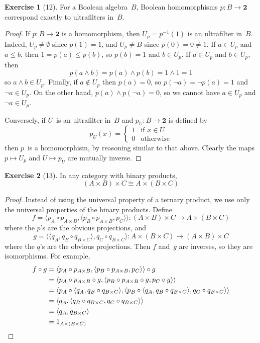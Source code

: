 \documentclass[letterpaper,12pt]{article}
\newcommand{\iso}{\cong}
\newcommand{\meet}{\wedge}
\newcommand{\compl}{\lnot}
\newcommand{\after}{\circ}
\newcommand{\pair}[2]{\langle{#1},{#2}\rangle}
\newcommand{\inv}[1]{#1^{-1}}
\newcommand{\cat}[1]{\mathbf{#1}}
\theoremstyle{definition}
\newtheorem*{exer}{Exercise}
\theoremstyle{remark}
\theoremstyle{direction}
\begin{document}
\begin{exer}[12]
For a Boolean algebra~\(B\), Boolean homomorphisms \(p:B\to\cat{2}\) correspond exactly to ultrafilters in~\(B\).
\end{exer}
\begin{proof}
If \(p:B\to\cat{2}\) is a homomorphism, then \(U_p=\inv{p}(1)\) is an ultrafilter in~\(B\). Indeed, \(U_p\ne\emptyset\) since \(p(1)=1\), and \(U_p\ne B\) since \(p(0)=0\ne 1\). If \(a\in U_p\) and \(a\le b\), then \(1=p(a)\le p(b)\), so \(p(b)=1\) and \(b\in U_p\). If \(a\in U_p\) and \(b\in U_p\), then
\[p(a\meet b)=p(a)\meet p(b)=1\meet 1=1\]
so \(a\meet b\in U_p\). Finally, if \(a\not\in U_p\) then \(p(a)=0\), so \(p(\compl a)=\compl p(a)=1\) and \(\compl a\in U_p\). On the other hand, \(p(a)\meet p(\compl a)=0\), so we cannot have \(a\in U_p\) and \(\compl a\in U_p\).

Conversely, if \(U\)~is an ultrafilter in~\(B\) and \(p_U:B\to\cat{2}\) is defined by
\[
p_U(x)=\begin{cases}
1&\text{if }x\in U\\
0&\text{otherwise}
\end{cases}
\]
then \(p\)~is a homomorphism, by reasoning similar to that above. Clearly the maps \(p\mapsto U_p\) and \(U\mapsto p_U\) are mutually inverse.
\end{proof}

\begin{exer}[13]
In any category with binary products,
\[(A\times B)\times C\iso A\times (B\times C)\]
\end{exer}
\begin{proof}
Instead of using the universal property of a ternary product, we use only the universal properties of the binary products. Define
\[f=\pair{p_A\after p_{A\times B}}{\pair{p_B\after p_{A\times B}}{p_C}}:(A\times B)\times C\to A\times(B\times C)\]
where the \(p\)'s are the obvious projections, and
\[g=\pair{\pair{q_A}{q_B\after q_{B\times C}}}{q_C\after q_{B\times C}}:A\times(B\times C)\to(A\times B)\times C\]
where the \(q\)'s are the obvious projections. Then \(f\) and~\(g\) are inverses, so they are isomorphisms. For example,
\begin{align*}
f\after g&=\pair{p_A\after p_{A\times B}}{\pair{p_B\after p_{A\times B}}{p_C}}\after g\\
	&=\pair{p_A\after p_{A\times B}\after g}{\pair{p_B\after p_{A\times B}\after g}{p_C\after g}}\\
	&=\pair{p_A\after \pair{q_A}{q_B\after q_{B\times C}}}{\pair{p_B\after \pair{q_A}{q_B\after q_{B\times C}}}{q_C\after q_{B\times C}}}\\
	&=\pair{q_A}{\pair{q_B\after q_{B\times C}}{q_C\after q_{B\times C}}}\\
	&=\pair{q_A}{q_{B\times C}}\\
	&=1_{A\times(B\times C)}\qedhere
\end{align*}
\end{proof}
\end{document}
